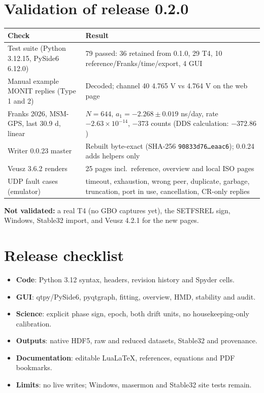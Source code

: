 \documentclass[11pt,a4paper]{article}
\begin{document}
\section{Validation of release 0.2.0}
\begin{center}
\small
\begin{tabular}{@{}p{.42\linewidth}p{.5\linewidth}@{}}
\toprule
Check & Result\\
\midrule
Test suite (Python 3.12.15, PySide6 6.12.0) & 79 passed: 36 retained from 0.1.0, 29 T4, 10 reference/Franks/time/export, 4 GUI\\
Manual example MONIT replies (Type 1 and 2) & Decoded; channel 40 4.765 V vs 4.764 V on the web page\\
Franks 2026, MSM-GPS, last 30.9 d, linear & $N=644$, $a_1=-2.268\pm0.019$ ns/day, rate $-2.63\times10^{-14}$, $-373$ counts (DDS calculation: $-372.86$)\\
Writer 0.0.23 master & Rebuilt byte-exact (SHA-256 \texttt{90833d76\dots eaac6}); 0.0.24 adds helpers only\\
Veusz 3.6.2 renders & 25 pages incl.\ reference, overview and local ISO pages\\
UDP fault cases (emulator) & timeout, exhaustion, wrong peer, duplicate, garbage, truncation, port in use, cancellation, CR-only replies\\
\bottomrule
\end{tabular}
\end{center}
\textbf{Not validated:} a real T4 (no GBO captures yet), the SETFSREL sign, Windows, Stable32
import, and Veusz 4.2.1 for the new pages.

\section{Release checklist}
\begin{itemize}
\item \textbf{Code}: Python 3.12 syntax, headers, revision history and Spyder cells.
\item \textbf{GUI}: qtpy/PySide6, pyqtgraph, fitting, overview, HMD, stability and audit.
\item \textbf{Science}: explicit phase sign, epoch, both drift units, no housekeeping-only calibration.
\item \textbf{Outputs}: native HDF5, raw and reduced datasets, Stable32 and provenance.
\item \textbf{Documentation}: editable LuaLaTeX, references, equations and PDF bookmarks.
\item \textbf{Limits}: no live writes; Windows, masermon and Stable32 site tests remain.
\end{itemize}
\end{document}
